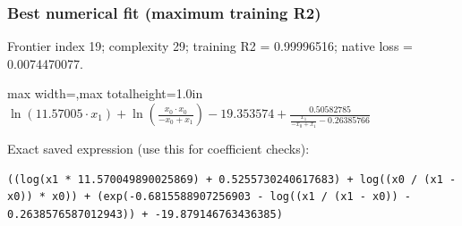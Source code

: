 \documentclass[10pt,letterpaper,landscape]{article}
\begin{document}
\begin{minipage}[t]{0.485\textwidth}
\subsubsection*{Best numerical fit (maximum training R2)}
Frontier index 19; complexity 29; training R2 = 0.99996516; native loss = 0.0074470077.
\begin{center}\begin{adjustbox}{max width=\linewidth,max totalheight=1.0in}$\displaystyle \ln{\left(11.57005 \cdot x_{1} \right)} + \ln{\left(\frac{x_{0} \cdot x_{0}}{- x_{0} + x_{1}} \right)} - 19.353574 + \frac{0.50582785}{\frac{x_{1}}{- x_{0} + x_{1}} - 0.26385766}$\end{adjustbox}\end{center}
{\scriptsize Exact saved expression (use this for coefficient checks):}
\begin{lstlisting}
((log(x1 * 11.570049890025869) + 0.5255730240617683) + log((x0 / (x1 - x0)) * x0)) + (exp(-0.6815588907256903 - log((x1 / (x1 - x0)) - 0.2638576587012943)) + -19.879146763436385)
\end{lstlisting}
\end{minipage}\hfill
\end{document}
